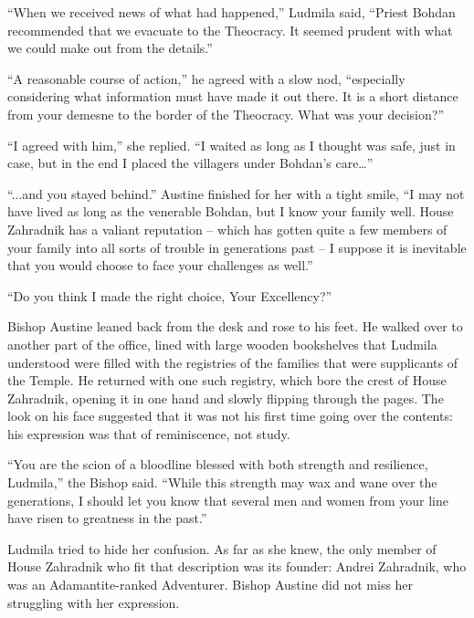  

“When we received news of what had happened,” Ludmila said, “Priest Bohdan recommended that we evacuate to the Theocracy. It seemed prudent with what we could make out from the details.”

 

“A reasonable course of action,” he agreed with a slow nod, “especially considering what information must have made it out there. It is a short distance from your demesne to the border of the Theocracy. What was your decision?”

 

“I agreed with him,” she replied. “I waited as long as I thought was safe, just in case, but in the end I placed the villagers under Bohdan’s care…”

 

“...and you stayed behind.” Austine finished for her with a tight smile, “I may not have lived as long as the venerable Bohdan, but I know your family well. House Zahradnik has a valiant reputation – which has gotten quite a few members of your family into all sorts of trouble in generations past – I suppose it is inevitable that you would choose to face your challenges as well.”

 

“Do you think I made the right choice, Your Excellency?”

 

Bishop Austine leaned back from the desk and rose to his feet. He walked over to another part of the office, lined with large wooden bookshelves that Ludmila understood were filled with the registries of the families that were supplicants of the Temple. He returned with one such registry, which bore the crest of House Zahradnik, opening it in one hand and slowly flipping through the pages. The look on his face suggested that it was not his first time going over the contents: his expression was that of reminiscence, not study.

 

“You are the scion of a bloodline blessed with both strength and resilience, Ludmila,” the Bishop said. “While this strength may wax and wane over the generations, I should let you know that several men and women from your line have risen to greatness in the past.”

 

Ludmila tried to hide her confusion. As far as she knew, the only member of House Zahradnik who fit that description was its founder: Andrei Zahradnik, who was an Adamantite-ranked Adventurer. Bishop Austine did not miss her struggling with her expression.

